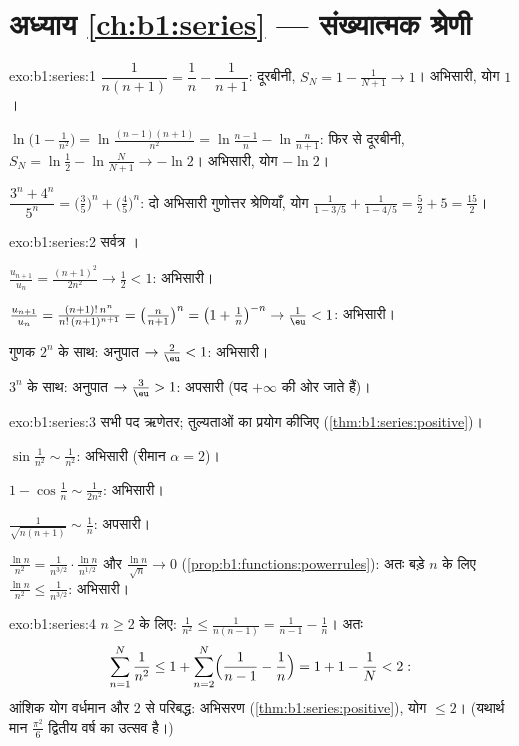 \section*{अध्याय \ref{ch:b1:series} --- संख्यात्मक श्रेणी}

\begin{solution}{exo:b1:series:1}
$\dfrac{1}{n(n+1)} = \dfrac1n - \dfrac{1}{n+1}$: दूरबीनी, $S_N = 1 -
\frac{1}{N+1} \to 1$। अभिसारी, योग $1$।

$\ln\bigl(1 - \frac{1}{n^2}\bigr) = \ln\frac{(n-1)(n+1)}{n^2} =
\ln\frac{n-1}{n} - \ln\frac{n}{n+1}$: फिर से दूरबीनी, $S_N = \ln\frac12 -
\ln\frac{N}{N+1} \to -\ln 2$। अभिसारी, योग $-\ln 2$।

$\dfrac{3^n + 4^n}{5^n} = \bigl(\frac35\bigr)^n + \bigl(\frac45\bigr)^n$: दो
अभिसारी गुणोत्तर श्रेणियाँ, योग $\frac{1}{1 - 3/5} + \frac{1}{1 - 4/5} =
\frac52 + 5 = \frac{15}{2}$।
\end{solution}

\begin{solution}{exo:b1:series:2}
सर्वत्र ।

$\frac{u_{n+1}}{u_n} = \frac{(n+1)^2}{2n^2} \to \frac12 < 1$: अभिसारी।

$\frac{u_{n+1}}{u_n} = \frac{(n+1)!\,n^n}{n!\,(n+1)^{n+1}} =
\bigl(\frac{n}{n+1}\bigr)^n = \bigl(1 + \frac1n\bigr)^{-n} \to \frac1\eu <
1$: अभिसारी।

गुणक $2^n$ के साथ: अनुपात $\to \frac2\eu < 1$: अभिसारी।

$3^n$ के साथ: अनुपात $\to \frac3\eu > 1$: अपसारी (पद $+\infty$ की ओर जाते
हैं)।
\end{solution}

\begin{solution}{exo:b1:series:3}
सभी पद ऋणेतर; तुल्यताओं का प्रयोग कीजिए (\cref{thm:b1:series:positive})।

$\sin\frac{1}{n^2} \sim \frac{1}{n^2}$: अभिसारी (रीमान $\alpha = 2$)।

$1 - \cos\frac1n \sim \frac{1}{2n^2}$: अभिसारी।

$\frac{1}{\sqrt{n(n+1)}} \sim \frac1n$: अपसारी।

$\frac{\ln n}{n^2} = \frac{1}{n^{3/2}}\cdot\frac{\ln n}{n^{1/2}}$
और $\frac{\ln n}{\sqrt n} \to 0$ (\cref{prop:b1:functions:powerrules}): अतः
बड़े $n$ के लिए $\frac{\ln n}{n^2} \leq \frac{1}{n^{3/2}}$: अभिसारी।
\end{solution}

\begin{solution}{exo:b1:series:4}
$n \geq 2$ के लिए: $\frac{1}{n^2} \leq \frac{1}{n(n-1)} = \frac{1}{n-1} -
\frac1n$। अतः
\[
\sum_{n=1}^{N} \frac{1}{n^2} \leq 1 + \sum_{n=2}^{N}
\Bigl(\frac{1}{n-1} - \frac1n\Bigr) = 1 + 1 - \frac1N < 2 :
\]
आंशिक योग वर्धमान और $2$ से परिबद्ध: अभिसरण (\cref{thm:b1:series:positive}),
योग $\leq 2$। (यथार्थ मान $\frac{\pi^2}{6}$ द्वितीय वर्ष का उत्सव है।)
\end{solution}


